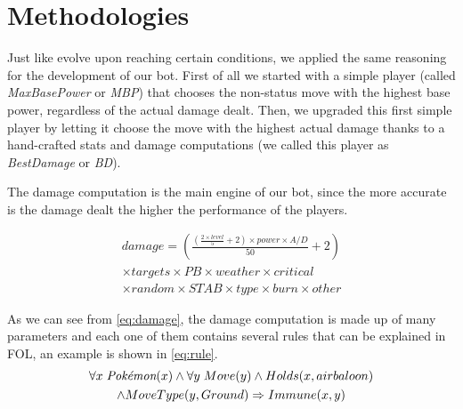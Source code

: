 \section{Methodologies}\label{sec:methodologies}
Just like \poke evolve upon reaching certain conditions, we applied the same reasoning for the development of our bot. First of all we started with a simple player (called \textit{MaxBasePower} or \textit{MBP}) that chooses the non-status move with the highest base power, regardless of the actual damage dealt. Then, we upgraded this first simple player by letting it choose the move with the highest actual damage thanks to a hand-crafted stats and damage computations (we called this player as \textit{BestDamage} or \textit{BD}).

The damage computation is the main engine of our bot, since the more accurate is the damage dealt the higher the performance of the players.

\begin{multline} 
    damage = \left (\frac{(\frac{2\times level}{5} + 2) \times power \times A/D}{50} + 2 \right) \\ \times targets \times PB \times weather \times critical \\ \times random \times STAB \times type \times burn \times other
\label{eq:damage}   
\end{multline}

As we can see from \eqref{eq:damage}, the damage computation is made up of many parameters and each one of them contains several rules that can be explained in FOL, an example is shown in \eqref{eq:rule}.
\begin{multline}
    \forall x \hspace{1mm} \poke(x) \wedge \forall y \hspace{1mm} Move(y) \wedge Holds(x,airbaloon) \\
    \wedge MoveType(y,Ground) \Rightarrow Immune(x,y)
    \label{eq:rule}
\end{multline}

